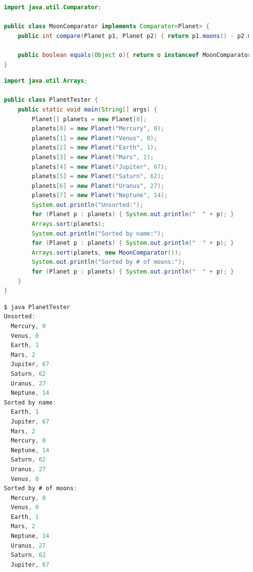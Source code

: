 \documentclass[8pt,a4paper,compress]{beamer}
\begin{document}
\begin{frame}[fragile]
\pause

\begin{lstlisting}[language=Java]
import java.util.Comparator;

public class MoonComparator implements Comparator<Planet> {
    public int compare(Planet p1, Planet p2) { return p1.moons() - p2.moons(); }
    
    public boolean equals(Object o){ return o instanceof MoonComparator; }
}
\end{lstlisting}

\begin{lstlisting}[language=Java]
import java.util.Arrays;

public class PlanetTester {
    public static void main(String[] args) {
        Planet[] planets = new Planet[8];
        planets[0] = new Planet("Mercury", 0);
        planets[1] = new Planet("Venus", 0);
        planets[2] = new Planet("Earth", 1);
        planets[3] = new Planet("Mars", 2);
        planets[4] = new Planet("Jupiter", 67);
        planets[5] = new Planet("Saturn", 62);
        planets[6] = new Planet("Uranus", 27);
        planets[7] = new Planet("Neptune", 14);
        System.out.println("Unsorted:");
        for (Planet p : planets) { System.out.println("  " + p); }
        Arrays.sort(planets);
        System.out.println("Sorted by name:");
        for (Planet p : planets) { System.out.println("  " + p); }
        Arrays.sort(planets, new MoonComparator());
        System.out.println("Sorted by # of moons:");
        for (Planet p : planets) { System.out.println("  " + p); }
    }
}
\end{lstlisting}
\end{frame}

\begin{frame}[fragile]
\pause

\begin{lstlisting}[language=Java]
$ java PlanetTester 
Unsorted:
  Mercury, 0
  Venus, 0
  Earth, 1
  Mars, 2
  Jupiter, 67
  Saturn, 62
  Uranus, 27
  Neptune, 14
Sorted by name:
  Earth, 1
  Jupiter, 67
  Mars, 2
  Mercury, 0
  Neptune, 14
  Saturn, 62
  Uranus, 27
  Venus, 0
Sorted by # of moons:
  Mercury, 0
  Venus, 0
  Earth, 1
  Mars, 2
  Neptune, 14
  Uranus, 27
  Saturn, 62
  Jupiter, 67
\end{lstlisting}
\end{frame}
\end{document}
